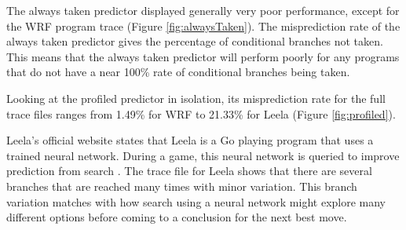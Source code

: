 The always taken predictor displayed generally very poor performance, except for the WRF program trace (Figure \ref{fig:alwaysTaken}). The misprediction rate of the always taken predictor gives the percentage of conditional branches not taken. This means that the always taken predictor will perform poorly for any programs that do not have a near 100\% rate of conditional branches being taken.

Looking at the profiled predictor in isolation, its misprediction rate for the full trace files ranges from 1.49\% for WRF to 21.33\% for Leela (Figure \ref{fig:profiled}).

Leela's official website states that Leela is a Go playing program that uses a trained neural network. During a game, this neural network is queried to improve prediction from search \cite{leela_website}. The trace file for Leela shows that there are several branches that are reached many times with minor variation. This branch variation matches with how search using a neural network might explore many different options before coming to a conclusion for the next best move.

